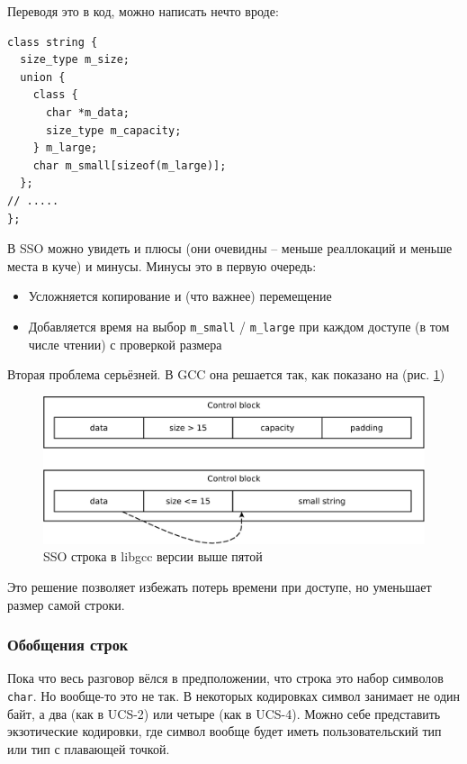 \documentclass[a4paper,12pt,oneside]{article}
\begin{document}
Переводя это в код, можно написать нечто вроде:

\begin{lstlisting}
class string {
  size_type m_size;
  union {
    class {
      char *m_data;
      size_type m_capacity;
    } m_large;
    char m_small[sizeof(m_large)];
  };
// .....
};
\end{lstlisting}

В SSO можно увидеть и плюсы (они очевидны -- меньше реаллокаций и меньше места в куче) и минусы. Минусы это в первую очередь:

\begin{itemize}
\item Усложняется копирование и (что важнее) перемещение
\item  Добавляется время на выбор \lstinline!m_small! / \lstinline!m_large! при каждом доступе (в том числе чтении) с проверкой размера
\end{itemize}

Вторая проблема серьёзней. В GCC она решается так, как показано на (рис. \ref{fig:string-sso-gcc})

\begin{figure}[ht]
\centering
\includegraphics[width=1.0\textwidth]{illustrations/string-sso-gcc-crop.pdf}
\caption{SSO строка в libgcc версии выше пятой}
\label{fig:string-sso-gcc}
\end{figure}

Это решение позволяет избежать потерь времени при доступе, но уменьшает размер самой строки.

\subsubsection{Обобщения строк}\label{subsub:strtraits}

Пока что весь разговор вёлся в предположении, что строка это набор символов \lstinline!char!. Но вообще-то это не так. В некоторых кодировках символ занимает не один байт, а два (как в UCS-2) или четыре (как в UCS-4). Можно себе представить экзотические кодировки, где символ вообще будет иметь пользовательский тип или тип с плавающей точкой.
\end{document}
